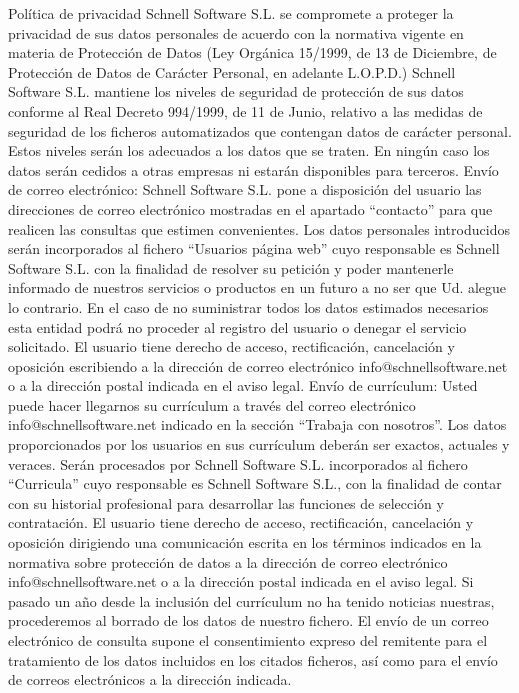 \documentclass[10pt,a4paper]{article}
\begin{document}
\begin{enumerate}
Política de privacidad
Schnell Software S.L. se compromete a proteger la privacidad de sus datos personales de acuerdo con la normativa vigente en materia de Protección de Datos (Ley Orgánica 15/1999, de 13 de Diciembre, de Protección de Datos de Carácter Personal, en adelante L.O.P.D.)
Schnell Software S.L. mantiene los niveles de seguridad de protección de sus datos conforme al Real Decreto 994/1999, de 11 de Junio, relativo a las medidas de seguridad de los ficheros automatizados que contengan datos de carácter personal. Estos niveles serán los adecuados a los datos que se traten. En ningún caso los datos serán cedidos a otras empresas ni estarán disponibles para terceros.
Envío de correo electrónico: Schnell Software S.L. pone a disposición del usuario las direcciones de correo electrónico mostradas en el apartado “contacto” para que realicen las consultas que estimen convenientes. Los datos personales introducidos serán incorporados al fichero “Usuarios página web” cuyo responsable es Schnell Software S.L. con la finalidad de resolver su petición y poder mantenerle informado de nuestros servicios o productos en un futuro a no ser que Ud. alegue lo contrario. En el caso de no suministrar todos los datos estimados necesarios esta entidad podrá no proceder al registro del usuario o denegar el servicio solicitado.
El usuario tiene derecho de acceso, rectificación, cancelación y oposición escribiendo a la dirección de correo electrónico info@schnellsoftware.net o a la dirección postal indicada en el aviso legal.
Envío de currículum: Usted puede hacer llegarnos su currículum a través del correo electrónico info@schnellsoftware.net indicado en la sección “Trabaja con nosotros”. Los datos proporcionados por los usuarios  en sus currículum deberán ser exactos, actuales y veraces. Serán procesados por Schnell Software S.L.  incorporados al fichero “Curricula” cuyo responsable es Schnell Software S.L., con la finalidad de contar con su historial profesional para desarrollar las funciones de selección y contratación.
El usuario tiene derecho de acceso, rectificación, cancelación y oposición dirigiendo una comunicación escrita en los términos indicados en la normativa sobre protección de datos a la dirección de correo electrónico info@schnellsoftware.net o a la dirección postal indicada en el aviso legal. Si pasado un año desde la inclusión del currículum no ha tenido noticias nuestras, procederemos al borrado de los datos de nuestro fichero.
El envío de un correo electrónico de consulta supone el consentimiento expreso del remitente para el tratamiento de los datos incluidos en los citados ficheros, así como para el envío de correos electrónicos a la dirección indicada.


\end{enumerate}
\end{document}
